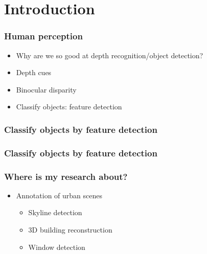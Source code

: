 \documentclass{beamer}
\begin{document}
\section{Introduction}
\frame
{
	\frametitle{Human perception}
	\begin{itemize}
	\item <+-| alert@+> Why are we so good at depth recognition/object detection?
	\item <+-| alert@+> Depth cues
	\item <+-| alert@+> Binocular disparity


	\item <+-| alert@+> Classify objects: feature detection
	\end{itemize}
}

\frame
{
	\frametitle{Classify objects by feature detection}
}

\frame
{
	\frametitle{Classify objects by feature detection}
}

\frame
{
}

\frame
{
	\frametitle{Where is my research about?}
	\begin{itemize}
	\item <+-| alert@+> {Annotation of urban scenes}
		\begin{itemize}
			\item <+-| alert@+> Skyline detection
			\item <+-| alert@+> 3D building reconstruction
			\item <+-| alert@+> Window detection
		\end{itemize}
	\end{itemize}

}
\end{document}
